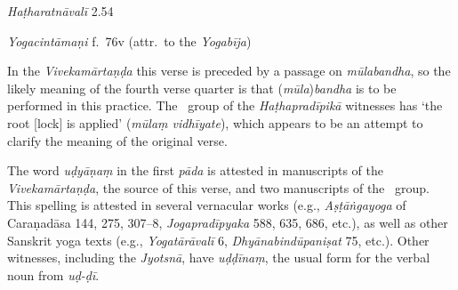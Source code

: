 \begin{ekdosis}
\begin{testimonia}[hp03_060]
\emph{Haṭharatnāvalī} 2.54
\begin{versinnote}
\end{versinnote}

\emph{Yogacintāmaṇi} f.~76v (attr.~to the \emph{Yogabīja})
\begin{versinnote}
\end{versinnote}

\end{testimonia}

\begin{philcomm}[hp03_060]
In the \emph{Vivekamārtaṇḍa} this verse is preceded by a passage on \emph{mūlabandha}, so the likely meaning of the fourth verse quarter is that (\emph{mūla})\emph{bandha} is to be performed in this practice. The \textdelta\ group of the \emph{Haṭhapradīpikā} witnesses has `the root [lock] is applied' (\emph{mūlaṃ vidhīyate}), which appears to be an attempt to clarify the meaning of the original verse.\lb

The word \emph{uḍyāṇaṃ} in the first \emph{pāda} is attested in manuscripts of the \emph{Vivekamārtaṇḍa}, the source of this verse, and two manuscripts of the \textalpha\ group. This spelling is attested in several vernacular works (e.g., \emph{Aṣṭāṅgayoga} of Caraṇadāsa 144, 275, 307–8, \emph{Jogapradīpyaka} 588, 635, 686, etc.), as well as other Sanskrit yoga texts (e.g., \emph{Yogatārāvalī} 6, \emph{Dhyānabindūpaniṣat} 75, etc.). Other witnesses, including the \emph{Jyotsnā}, have \emph{uḍḍīnaṃ}, the usual form for the verbal noun from \emph{uḍ-ḍī}.


\end{philcomm}


\end{ekdosis}
